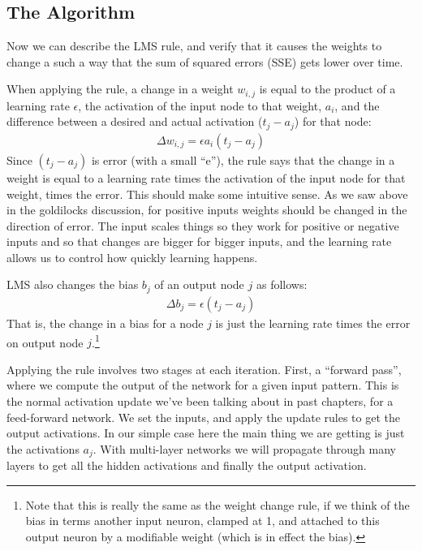 \subsection{The Algorithm}

Now we can describe the LMS rule, and verify that it causes the weights to change a such a way that the sum of squared errors (SSE) gets lower over time.

When applying the rule, a change in a weight $w_{i,j}$ is equal to the product of a learning rate $\epsilon$, the activation of the input node to that weight, $a_i$, and the difference between a desired and actual activation ($t_j - a_j$) for that node:
\begin{eqnarray*}
\Delta w_{i,j}  =  \epsilon a_i (t_j - a_j)
\end{eqnarray*}
Since $(t_j - a_j)$ is error  (with a small ``e''), the rule says that the change in a weight is equal to a learning rate times the activation of the input node for that weight, times the error. This should make some intuitive sense. As we saw above in the goldilocks discussion, for positive inputs weights should be changed in the direction of error. The input scales things so they work for positive or negative inputs and so that changes are bigger for bigger inputs, and the learning rate allows us to control how quickly learning happens. 

LMS also changes the bias $b_j$ of an output node $j$ as follows: 
\begin{eqnarray*}
\Delta b_j  =  \epsilon (t_j - a_j)
\end{eqnarray*}
That is, the change in a bias for a node $j$ is just the learning rate times the error on output node $j$.\footnote{Note that this is really the same as the weight change rule, if we think of the bias in terms another input neuron, clamped at 1, and attached to this output neuron by a modifiable weight (which is in effect the bias).}

Applying the rule involves two stages at each iteration. First, a ``forward pass'', where we compute the output of the network for a given input pattern. This is the normal activation update we've been talking about in past chapters, for a feed-forward network. We set the inputs, and apply the update rules to get the output activations. In our simple case here the main thing we are getting is just the activations $a_j$.  With multi-layer  networks we will propagate through many layers to get all the hidden activations and finally the output activation. 

